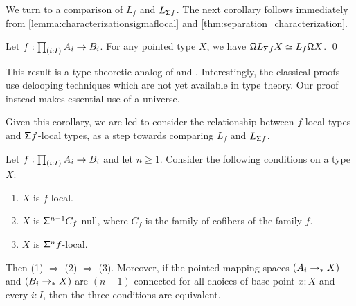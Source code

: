 We turn to a comparison of $L_f$ and $L_{\mathsf{\Sigma} f}$.
The next corollary follows immediately from \cref{lemma:characterizationsigmaflocal}
and \cref{thm:separation_characterization}.

\begin{cor}\label{remark:commutativitylooplocalization}
    Let $f : \prd{i:I} A_i \to B_i$.
    For any pointed type $X$, we have
    $\mathsf{\Omega} L_{\mathsf{\Sigma}^{}{f}} X \simeq L_f \mathsf{\Omega} X$. \qed
\end{cor}

This result is a type theoretic analog of \cite[Theorem 3.1]{Bousfield} and \cite[3.A.1]{Farjoun}.
Interestingly, the classical proofs use delooping techniques which are not yet available in type theory.
Our proof instead makes essential use of a universe.

Given this corollary, we are led to consider the relationship between $f$-local types and $\mathsf{\Sigma} f$-local types, as a step towards comparing $L_f$ and $L_{\mathsf{\Sigma} f}$.

\begin{thm}\label{theorem:characterizinglocalness}
    Let $f: \prd{i:I} A_i \to B_i$ and let $n \geq 1$.
    Consider the following conditions on a type $X$:
    \begin{enumerate}
    \item $X$ is $f$-local.
    \item $X$ is $\mathsf{\Sigma}^{n-1} C_f$-null,
    where $C_f$ is the family of cofibers of the family $f$. 
    \item $X$ is $\mathsf{\Sigma}^{n} f$-local.
    \end{enumerate}
    Then (1) $\Rightarrow$ (2) $\Rightarrow$ (3).
    Moreover, if the pointed mapping spaces $(A_i \to_{\ast} X)$ and $(B_i \to_{\ast} X)$
    are $(n-1)$-connected for all choices of base point $x : X$
    and every $i : I$,
    then the three conditions are equivalent.
\end{thm}

